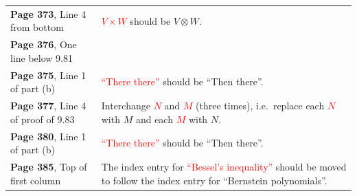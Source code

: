 \documentclass[10pt, a4paper]{article}
\newcommand{\red}[1]{\textcolor{red}{#1}}
\newcommand{\green}[1]{\textcolor{green!50!black}{#1}}
\begin{document}
\begin{longtable}{|R{.46\textwidth}|R{.50\textwidth}|}
	\textbf{Page 373}, Line 4 from bottom &\red{$V \times W$} should be \green{$V \otimes W$}. \\ 
	\textbf{Page 376}, One line below 9.81 & \\ \hline
	\textbf{Page 375}, Line 1 of part (b) & \red{``There there''} should be \green{``Then there''}. \\ \hline
	\textbf{Page 377}, Line 4 of proof of 9.83 & Interchange \red{$N$} and \red{$M$} (three times), i.e.\ replace each \red{$N$} with \green{$M$} and each \red{$M$} with \green{$N$}. \\ \hline
	\textbf{Page 380}, Line 1 of part (b) & \red{``There there''} should be \green{``Then there''}. \\ \hline
	\textbf{Page 385}, Top of first column & The index entry for \red{``Bessel's inequality''} should be moved to follow the index entry for \green{``Bernstein polynomials''}. \\ \hline
\end{longtable}
\end{document}

